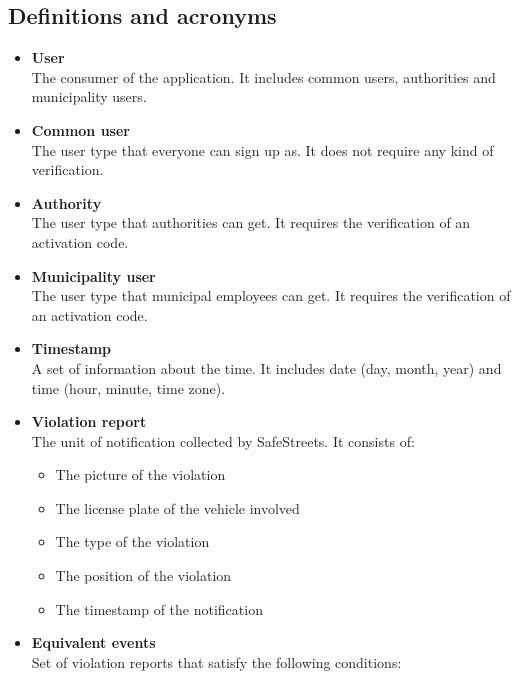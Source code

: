 \documentclass[./main.tex]{subfiles}
\begin{document}
\subsection{Definitions and acronyms}

\begin{itemize}
\item
  \textbf{User}\\
  The consumer of the application. It includes common users, authorities
  and municipality users.
\item
  \textbf{Common user}\\
  The user type that everyone can sign up as. It does not require any
  kind of verification.
\item
  \textbf{Authority}\\
  The user type that authorities can get. It requires the verification
  of an activation code.
\item
  \textbf{Municipality user}\\
  The user type that municipal employees can get. It requires the
  verification of an activation code.
\item
  \textbf{Timestamp}\\
  A set of information about the time. It includes date (day, month,
  year) and time (hour, minute, time zone).
\item
  \textbf{Violation report}\\
  The unit of notification collected by SafeStreets. It consists of:

  \begin{itemize}
  \item
    The picture of the violation
  \item
    The license plate of the vehicle involved
  \item
    The type of the violation
  \item
    The position of the violation
  \item
    The timestamp of the notification
  \end{itemize}
\item
  \textbf{Equivalent events}\\
  Set of violation reports that satisfy the following conditions:


\end{itemize}
\end{document}
